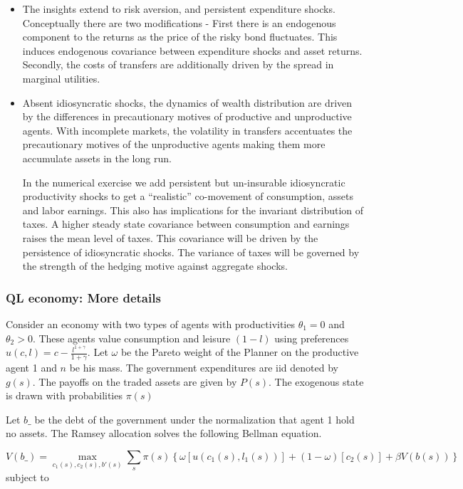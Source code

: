 \documentclass[thmsb,11pt]{article}
\begin{document}
\begin{itemize}
 
\item The insights extend to  risk aversion, and persistent expenditure shocks. Conceptually there are two modifications - First there  is an endogenous component to the returns as the price of the risky bond fluctuates. This induces endogenous covariance between expenditure shocks and asset returns. Secondly, the costs of transfers are additionally driven by the spread in marginal utilities.

\item  Absent idiosyncratic shocks, the dynamics of wealth distribution are driven by the differences in precautionary motives of productive and unproductive agents. With incomplete markets, the volatility in transfers accentuates the precautionary motives of the unproductive agents making them more accumulate assets in the long run. 

In the numerical exercise we add persistent but un-insurable idiosyncratic productivity shocks to get a ``realistic'' co-movement of  consumption, assets and labor earnings. This also has implications for the invariant  distribution of taxes. A higher steady state covariance between consumption and earnings raises the mean level of taxes. This covariance will be driven by the persistence of idiosyncratic shocks. The variance of taxes will be governed by the strength of the hedging motive against aggregate shocks.

\end{itemize} 

\subsubsection{QL economy: More details}

Consider an economy with two types of agents with productivities $\theta_1=0$ and $\theta_2>0$. These agents  value consumption and leisure $(1-l)$ using preferences $u(c,l)=c-\frac{l^{1+\gamma}}{1+\gamma}$. Let $\omega$ be the Pareto weight of the Planner on the productive agent 1 and $n$ be his mass. The government expenditures are iid  denoted by $g(s)$. The payoffs on the traded assets are given by $P(s)$.  The exogenous state is drawn with probabilities $\pi(s)$

Let $b\_$ be the debt of the government under the normalization that agent 1 hold no assets. The Ramsey allocation solves the following Bellman equation.

 
\begin{equation}
	\label{eq-2 agent QL obj}
   	V(b\_)=\max_{c_1(s),c_2(s),b'(s)} \sum_{s}\pi(s)\left\{\omega\left[u(c_1(s),l_1(s))\right]+(1-\omega)\left[c_2(s)\right]+\beta V(b(s)) \right\}
\end{equation}   
subject to
\end{document}
